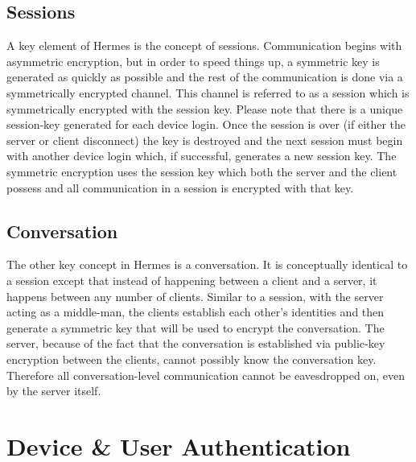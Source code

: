 \documentclass{article}
\begin{document}
\subsection{Sessions}

A key element of Hermes is the concept of sessions. Communication begins with asymmetric encryption, but in order to speed things up, a symmetric key is generated as quickly as possible and the rest of the communication is done via a symmetrically encrypted channel. This channel is referred to as a session which is symmetrically encrypted with the session key. Please note that there is a unique session-key generated for each device login. Once the session is over (if either the server or client disconnect) the key is destroyed and the next session must begin with another device login which, if successful, generates a new session key. The symmetric encryption uses the session key which both the server and the client possess and all communication in a session is encrypted with that key.

\subsection{Conversation}

The other key concept in Hermes is a conversation. It is conceptually identical to a session except that instead of happening between a client and a server, it happens between any number of clients. Similar to a session, with the server acting as a middle-man, the clients establish each other's identities and then generate a symmetric key that will be used to encrypt the conversation. The server, because of the fact that the conversation is established via public-key encryption between the clients, cannot possibly know the conversation key. Therefore all conversation-level communication cannot be eavesdropped on, even by the server itself.

\section{Device \& User Authentication}
\end{document}
